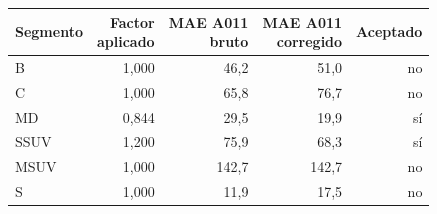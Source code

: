 \begin{tabular}{lrrrr}
\toprule
Segmento & \makecell{Factor\\aplicado} & \makecell{MAE A011\\bruto} & \makecell{MAE A011\\corregido} & Aceptado \\
\midrule
B & 1,000 & 46,2 & 51,0 & no \\
C & 1,000 & 65,8 & 76,7 & no \\
MD & 0,844 & 29,5 & 19,9 & sí \\
SSUV & 1,200 & 75,9 & 68,3 & sí \\
MSUV & 1,000 & 142,7 & 142,7 & no \\
S & 1,000 & 11,9 & 17,5 & no \\
\bottomrule
\end{tabular}
